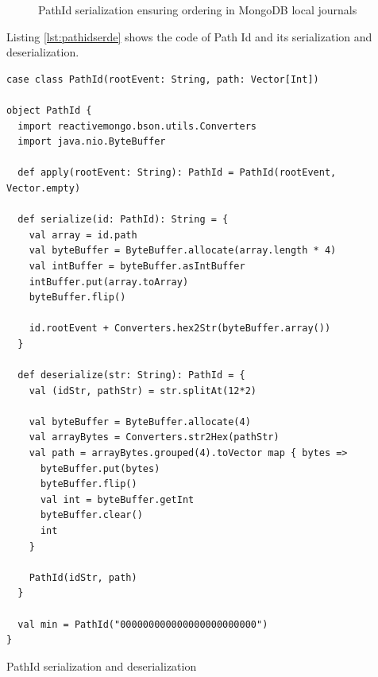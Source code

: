 \begin{figure}[h]
  \begin{center} 
    \caption{PathId serialization ensuring ordering in MongoDB local journals}
    \label{fig:pathidserde}
  \end{center}
\end{figure}

Listing \ref{lst:pathidserde} shows the code of Path Id and its serialization and deserialization.

\begin{listing}[h]
\begin{verbatim}
case class PathId(rootEvent: String, path: Vector[Int])

object PathId {
  import reactivemongo.bson.utils.Converters
  import java.nio.ByteBuffer

  def apply(rootEvent: String): PathId = PathId(rootEvent, Vector.empty)

  def serialize(id: PathId): String = {
    val array = id.path
    val byteBuffer = ByteBuffer.allocate(array.length * 4)
    val intBuffer = byteBuffer.asIntBuffer
    intBuffer.put(array.toArray)
    byteBuffer.flip()

    id.rootEvent + Converters.hex2Str(byteBuffer.array())
  }

  def deserialize(str: String): PathId = {
    val (idStr, pathStr) = str.splitAt(12*2)

    val byteBuffer = ByteBuffer.allocate(4)
    val arrayBytes = Converters.str2Hex(pathStr)
    val path = arrayBytes.grouped(4).toVector map { bytes =>
      byteBuffer.put(bytes)
      byteBuffer.flip()
      val int = byteBuffer.getInt
      byteBuffer.clear()
      int
    }

    PathId(idStr, path)
  }

  val min = PathId("000000000000000000000000")
}
\end{verbatim}
\caption{PathId serialization and deserialization}
\label{lst:pathidserde}
\end{listing}


